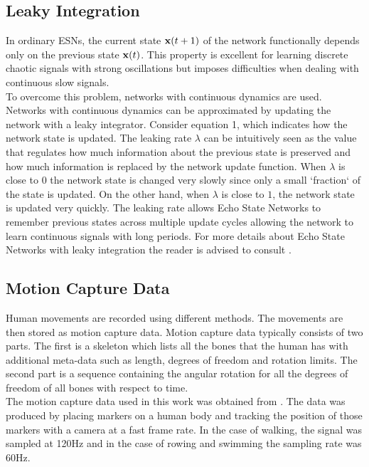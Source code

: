 \documentclass[letterpaper,9pt]{article}
\begin{document}
\subsection{Leaky Integration}

In ordinary ESNs, the current state ${\bf x}(t+1)$ of the network functionally depends only on the previous state ${\bf x}(t)$. This property is excellent for learning discrete chaotic signals with strong oscillations but imposes difficulties when dealing with continuous slow signals.\\

To overcome this problem, networks with continuous dynamics are used. Networks with continuous dynamics can be approximated by updating the network with a leaky integrator. Consider equation 1, which indicates how the network state is updated. The leaking rate $\lambda$ can be intuitively seen as the value that regulates how much information about the previous state is preserved and how much information is replaced by the network update function. When $\lambda$ is close to $0$ the network state is changed very slowly since only a small `fraction` of the state is updated. On the other hand, when $\lambda$ is close to $1$, the network state is updated very quickly. The leaking rate allows Echo State Networks to remember previous states across multiple update cycles allowing the network to learn continuous signals with long periods. For more details about Echo State Networks with leaky integration the reader is advised to consult \cite{JaegerESNTutorial}.

\subsection{Motion Capture Data}

Human movements are recorded using different methods. The movements are then stored as motion capture data. Motion capture data typically consists of two parts. The first is a skeleton which lists all the bones that the human has with additional meta-data such as length, degrees of freedom and rotation limits. The second part is a sequence containing the angular rotation for all the degrees of freedom of all bones with respect to time.\\

The motion capture data used in this work was obtained from \cite{CMUMocap}. The data was produced by placing markers on a human body and tracking the position of those markers with a camera at a fast frame rate. In the case of walking, the signal was sampled at 120Hz and in the case of rowing and swimming the sampling rate was 60Hz. 
\end{document}
